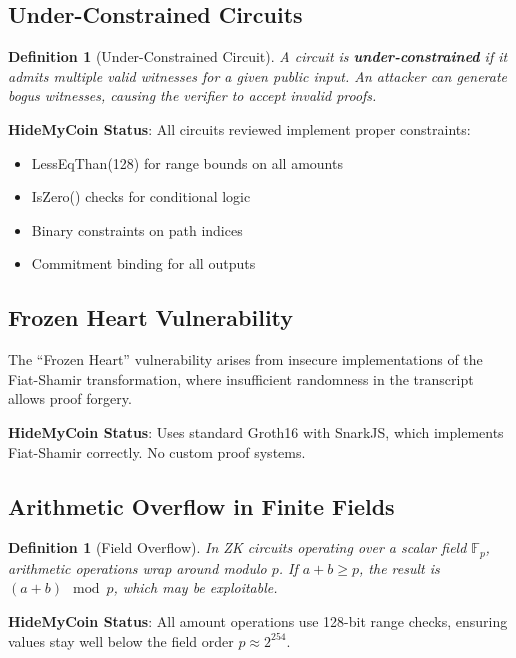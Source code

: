 \documentclass[11pt,a4paper]{article}
\newtheorem{definition}[theorem]{Definition}
\begin{document}
\subsection{Under-Constrained Circuits}

\begin{definition}[Under-Constrained Circuit]
A circuit is \textbf{under-constrained} if it admits multiple valid witnesses for a given public input. An attacker can generate bogus witnesses, causing the verifier to accept invalid proofs.
\end{definition}

\textbf{HideMyCoin Status}: All circuits reviewed implement proper constraints:
\begin{itemize}
    \item LessEqThan(128) for range bounds on all amounts
    \item IsZero() checks for conditional logic
    \item Binary constraints on path indices
    \item Commitment binding for all outputs
\end{itemize}

\subsection{Frozen Heart Vulnerability}

The ``Frozen Heart'' vulnerability arises from insecure implementations of the Fiat-Shamir transformation, where insufficient randomness in the transcript allows proof forgery.

\textbf{HideMyCoin Status}: Uses standard Groth16 with SnarkJS, which implements Fiat-Shamir correctly. No custom proof systems.

\subsection{Arithmetic Overflow in Finite Fields}

\begin{definition}[Field Overflow]
In ZK circuits operating over a scalar field $\mathbb{F}_p$, arithmetic operations wrap around modulo $p$. If $a + b \geq p$, the result is $(a + b) \mod p$, which may be exploitable.
\end{definition}

\textbf{HideMyCoin Status}: All amount operations use 128-bit range checks, ensuring values stay well below the field order $p \approx 2^{254}$.
\end{document}

